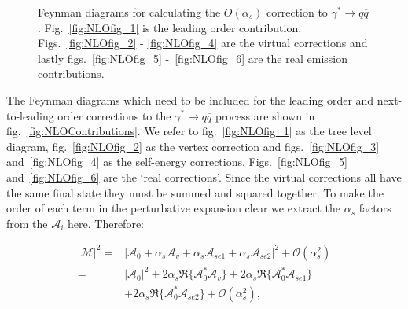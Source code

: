 \begin{figure}[tpb]
			\caption{Feynman diagrams for calculating the $O(\alpha_s)$ correction to $\gamma^*\rightarrow q\overline{q}$.
			Fig.~\eqref{fig:NLOfig_1} is the leading order contribution.  Figs.~\eqref{fig:NLOfig_2} - \ref{fig:NLOfig_4}
			are the virtual corrections and lastly figs.~\eqref{fig:NLOfig_5} -~\eqref{fig:NLOfig_6} are the real emission
			contributions.}
			\label{fig:NLOContributions}

		\end{figure}

		The Feynman diagrams which need to be included for the leading order and next-to-leading order corrections to the
		$\gamma^*\rightarrow q\overline{q}$ process are shown in fig.~\eqref{fig:NLOContributions}.  We refer to fig.~\eqref{fig:NLOfig_1} as the tree level diagram,
		fig.~\eqref{fig:NLOfig_2} as the vertex correction and figs.~\eqref{fig:NLOfig_3} and~\eqref{fig:NLOfig_4} as the self-energy corrections.
		Figs.~\eqref{fig:NLOfig_5} and~\eqref{fig:NLOfig_6} are the `real corrections'.  Since the virtual corrections all have the same final state
		they must be summed and squared together.  To make the order of each term in the perturbative expansion clear we extract the $\alpha_s$
		factors from the $\mathcal{A}_i$ here.  Therefore:

		\begin{equation}
		\begin{split}
			|\mathcal{M}|^2 = &|\mathcal{A}_0 + \alpha_s\mathcal{A}_v + \alpha_s\mathcal{A}_{se1} + \alpha_s\mathcal{A}_{se2}|^2 + \mathcal{O}(\alpha_s^2) \\
			                = &|\mathcal{A}_0|^2 + 2\alpha_s\Re\{\mathcal{A}^*_0\mathcal{A}_v\} + 2\alpha_s\Re\{\mathcal{A}^*_0\mathcal{A}_{se1}\} \\
			                  & + 2\alpha_s\Re\{\mathcal{A}^*_0\mathcal{A}_{se2}\} + \mathcal{O}(\alpha_s^2),
			\label{eqn:MEBreakdown}
		\end{split}
		\end{equation}

